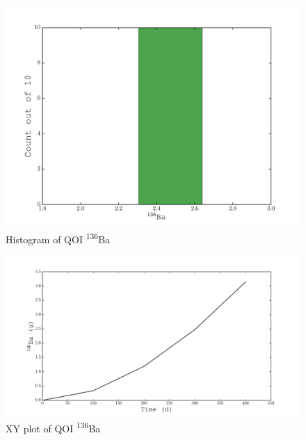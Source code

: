 \documentclass[11pt,notitlepage]{article}
\newcommand{\tss}{\textsuperscript}
\begin{document}
  \begin{figure}[H]
    \begin{center}
      \includegraphics[width=0.77\columnwidth]{../Origen2/PLOTS/BA136Post_HIST.pdf}
      \vspace{-5mm}
      \caption{Histogram of QOI \tss{136}Ba}
      \label{fig:POSTHISTBa136}
    \end{center}
  \end{figure}

    \begin{figure}[H]
    \begin{center}
      \includegraphics[width=0.77\columnwidth]{../Origen2/PLOTS/BA136Post_XY.pdf}
      \vspace{-5mm}
      \caption{XY plot of QOI \tss{136}Ba}
      \label{fig:POSTXYBa136}
    \end{center}
  \end{figure}
\end{document}
